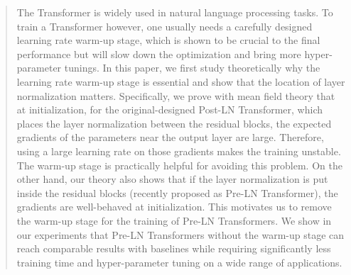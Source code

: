 \documentclass{article}
\begin{document}


\begin{abstract}
The Transformer is widely used in natural language processing tasks. To train a Transformer however, one usually needs a carefully designed learning rate warm-up stage, which is shown to be crucial to the final performance but will slow down the optimization and bring more hyper-parameter tunings. In this paper, we first study theoretically why the learning rate warm-up stage is essential and show that the location of layer normalization matters. Specifically, we prove with mean field theory that at initialization, for the original-designed Post-LN Transformer, which places the layer normalization between the residual blocks, the expected gradients of the parameters near the output layer are large. Therefore, using a large learning rate on those gradients makes the training unstable. The warm-up stage is practically helpful for avoiding this problem. On the other hand, our theory also shows that if the layer normalization is put inside the residual blocks (recently proposed as Pre-LN Transformer), the gradients are well-behaved at initialization. This motivates us to remove the warm-up stage for the training of Pre-LN Transformers. We show in our experiments that Pre-LN Transformers without the warm-up stage can reach comparable results with baselines while requiring significantly less training time and hyper-parameter tuning on a wide range of applications.
\end{abstract}
\end{document}
